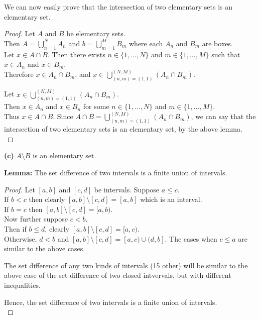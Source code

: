 \documentclass[12pt]{article}
\begin{document}
	We can now easily prove that the intersection of two elementary sets is an elementary set.
	
	\begin{proof}
		Let $A$ and $B$ be elementary sets. \\
		Then $A=\bigcup\limits_{n=1}^{N}A_{n}$ and $b=\bigcup\limits_{m=1}^{M}B_{m}$ where each $A_{n}$ and $B_{m}$ are boxes. \\
		Let $x \in A \cap B$.
		Then there exists $n \in \{1,...,N\}$ and $m \in \{1,...,M\}$ such that $x \in A_{n}$ and $x \in B_{m}$. \\
		Therefore $x \in A_{n} \cap B_{m}$, and $x \in \bigcup\limits_{(n,m)=(1,1)}^{(N,M)}(A_{n} \cap B_{m})$. \bigbreak
		
		Let $x \in \bigcup\limits_{(n,m)=(1,1)}^{(N,M)}(A_{n} \cap B_{m})$. \\
		Then $x \in A_{n}$ and $x \in B_{n}$ for some $n \in \{1,...,N\}$ and $m \in \{1,...,M\}$. \\
		Thus $x \in A \cap B$. \bigbreak
		Since  $A \cap B = \bigcup\limits_{(n,m)=(1,1)}^{(N,M)}(A_{n} \cap B_{m})$, we can say that the intersection of two elementary sets is an elementary set, by the above lemma. \\
	\end{proof}

	\hspace{-4 ex}\textbf{(c)} $A \setminus B$ is an elementary set. \bigbreak
	
	\textbf{Lemma:} The set difference of two intervals is a finite union of intervals.
	
	\begin{proof}
		Let $[a,b]$ and $[c,d]$ be intervals. \bigbreak
		Suppose $a \leq c$. \\
		If $ b < c$ then clearly $[a,b] \setminus [c,d] = [a,b]$ which is an interval. \\
		If $b=c$ then $[a,b] \setminus [c,d] = [a,b)$. \\
		Now further suppose $ c < b$. \\
		Then if $b \leq d$, clearly $[a,b] \setminus [c,d] = [a,c)$. \\
		Otherwise, $ d < b$ and $[a,b] \setminus [c,d] = [a,c) \cup (d,b]$. \bigbreak
		The cases when $c \leq a$ are similar to the above cases. \bigbreak
		
		The set difference of any two kinds of intervals (15 other) will be similar to the above case of the set difference of two closed intvervals, but with different inequalities. \bigbreak
		
		Hence, the set difference of two intervals is a finite union of intervals. \\
	\end{proof}
\end{document}
